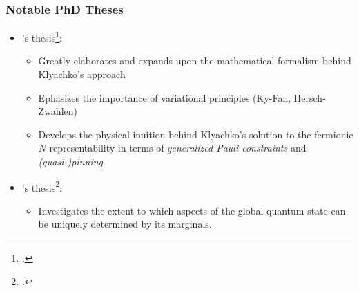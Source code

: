 \documentclass[
    9pt,
    hyperref={bookmarks=false, colorlinks=false}, %
    xcolor={dvipsnames},
]{beamer}
\begin{document}
\begin{frame}
    \frametitle{Notable PhD Theses}
    \begin{itemize}
        \item \citeauthor{schilling2015quantum}'s thesis\footcite{schilling2015quantum}: 
            \begin{itemize}
                \item Greatly elaborates and expands upon the mathematical formalism behind Klyachko's approach
                \item Ephasizes the importance of variational principles (Ky-Fan, Hersch-Zwahlen)
                \item Develops the physical inuition behind Klyachko's solution to the fermionic $N$-representability in terms of \textit{generalized Pauli constraints} and \textit{(quasi-)pinning}.
            \end{itemize}
        \item \citeauthor{klassen2017existence}'s thesis\footcite{klassen2017existence}:
            \begin{itemize}
                \item Investigates the extent to which aspects of the global quantum state can be uniquely determined by its marginals.
            \end{itemize}
    \end{itemize}
\end{frame}
\end{document}
